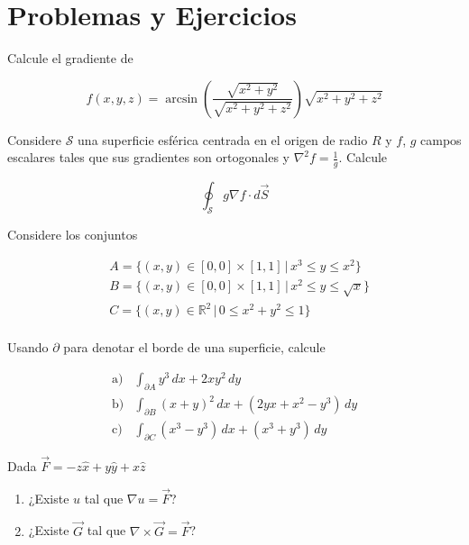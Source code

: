 \section{Problemas y Ejercicios}


\np

Calcule el gradiente de

\[f(x, y, z)=\arcsin\left(\frac{\sqrt{x^2+y^2}}{\sqrt{x^2+y^2+z^2}}\right)
\sqrt{x^2+y^2+z^2}\]
\bigbreak
\np

Considere $\mathcal{S}$ una superficie esférica centrada en el origen de radio $R$ y $f$, $g$ campos escalares tales que sus gradientes son ortogonales y $\nabla^2 f = \frac{1}{g}$. Calcule

\[\oint_\mathcal{S}g\nabla f\cdot d\Vec{S}\]
\bigbreak
\np

Considere los conjuntos

\begin{equation}
\begin{split}
    & A = \{(x,y)\in [0,0]\times[1,1]\,|\,x^3\leq y\leq x^2\}\\
    & B = \{(x,y)\in [0,0]\times[1,1]\,|\,x^2\leq y\leq \sqrt{x}\}\\
    & C = \{(x,y)\in \mathbb{R}^2\,|\, 0 \leq x^2+y^2\leq 1\}\\
\end{split}
\nonumber
\end{equation}

Usando $\partial$ para denotar el borde de una superficie, calcule

\begin{equation}
\begin{split}
    \mathrm{a})& \int_{\partial A} y^3\,dx + 2xy^2\,dy\\
    \mathrm{b})& \int_{\partial B} (x+y)^2\,dx + (2yx + x^2 - y^3)\,dy\\
    \mathrm{c})& \int_{\partial C} (x^3-y^3)\,dx + (x^3+y^3)\,dy
\end{split}
\nonumber
\end{equation}
\bigbreak
\np

Dada $\Vec{F}= -z\hat{x}+y\hat{y}+x\hat{z}$

\begin{enumerate}[label=\alph*)]
    \item ¿Existe $u$ tal que $\nabla u = \Vec{F}$?
    \item ¿Existe $\Vec{G}$ tal que $\nabla\times
    \Vec{G}=\Vec{F}$?
\end{enumerate}
\newpage
\np

